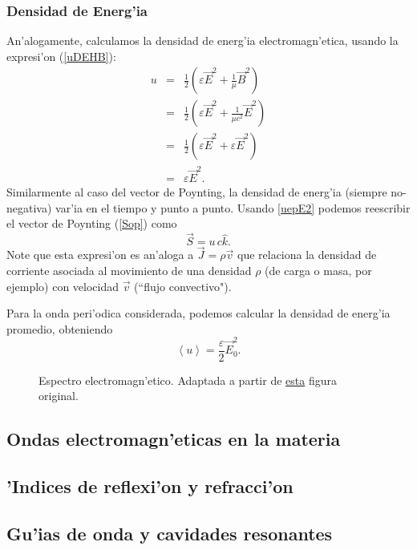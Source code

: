 \subsubsection{Densidad de Energ'ia}
An'alogamente, calculamos la densidad de energ'ia electromagn'etica, usando la expresi'on (\ref{uDEHB}):
\begin{eqnarray}
 u&=&\frac{1}{2}\left(\varepsilon\vec{E}^2+\frac{1}{\mu}\vec{B}^2\right)\\
&=&\frac{1}{2}\left(\varepsilon\vec{E}^2+\frac{1}{\mu c^2}\vec{E}^2\right)\\
&=&\frac{1}{2}\left(\varepsilon\vec{E}^2+\varepsilon\vec{E}^2\right)\\
&=&\varepsilon\vec{E}^2. \label{uepE2}
\end{eqnarray}
Similarmente al caso del vector de Poynting, la densidad de energ'ia (siempre no-negativa) var'ia en el tiempo y punto a punto. 
Usando \eqref{uepE2} podemos reescribir el vector de Poynting (\ref{Sop}) como
\begin{equation}
 \vec{S}=u\,c\hat{k}.
\end{equation}
Note que esta expresi'on es an'aloga a $\vec{J}=\rho\vec{v}$ que relaciona la densidad de corriente asociada al movimiento de una densidad $\rho$ (de carga o masa, por ejemplo) con velocidad $\vec{v}$ (``flujo convectivo").

Para la onda peri'odica considerada, podemos calcular la densidad de energ'ia promedio, obteniendo
\begin{equation}\label{uprom}
\left<u\right>=\frac{\varepsilon}{2}\vec{E}_0^2.
\end{equation}

\begin{figure}[!h]
\centerline{}
\caption{Espectro electromagn'etico. Adaptada a partir de \href{http://commons.wikimedia.org/wiki/File:EM_spectrum_es.svg}{esta} figura original.}
\label{fig:EMS}
\end{figure}

\subsection{Ondas electromagn'eticas en la materia}
\subsection{'Indices de reflexi'on y refracci'on}
\subsection{Gu'ias de onda y cavidades resonantes}


